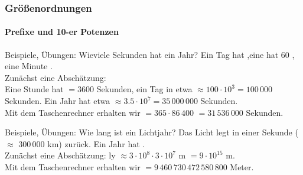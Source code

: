 \begin{frame}
  \frametitle{Gr\"o\ss{}enordnungen}
  \framesubtitle{Prefixe und 10-er Potenzen}
  \begin{block}{Beispiele, \"Ubungen: Wieviele Sekunden hat ein Jahr?}
    \pause
    Ein Tag hat ,eine  hat 
    60 , eine Minute .
    \pause\\
    Zun\"achst eine Absch\"atzung:
    \pause\\
    Eine Stunde hat  \pause $= 3600$ Sekunden, \pause
    ein Tag in etwa  \pause 
    $\approx 100 \cdot 10^3 = 100\,000$ Sekunden.\pause 
    Ein Jahr hat etwa  \pause 
    $\approx 3.5 \cdot 10^7 =35\,000\,000$ Sekunden.
    \pause\\
    Mit dem Taschenrechner erhalten wir  \pause 
    $= 365 \cdot 86\,400$ \pause $= 31\,536\,000$ Sekunden.
  \end{block}
  \begin{block}{Beispiele, \"Ubungen: Wie lang ist ein Lichtjahr?}
    \pause
    Das Licht legt in einer Sekunde  
    ($\approx$ 300\,000 km) zur\"uck. \pause Ein Jahr hat .
    \pause\\
    Zun\"achst eine Absch\"atzung:
     ly $\approx 3 \cdot 10^8 \cdot 3 \cdot 10^7$ m \pause $= 9 \cdot 10^{15}$ m.
    \pause\\
    Mit dem Taschenrechner erhalten wir  \pause 
    $=9\,460\,730\,472\,580\,800$ Meter.
  \end{block}
\end{frame}

